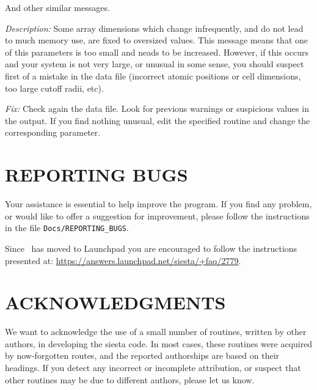 \begin{description}
\itemsep 10pt
\parsep 0pt

\item[\texttt{chkdim: ERROR: In \textit{routine} dimension \textit{parameter} =
\textit{value}. It must be  ...}]

And other similar messages.

\textit{Description:} Some array dimensions which change infrequently,
and do not lead to much memory use, are fixed to oversized
values. This message means that one of this parameters is too small
and neads to be increased.  However, if this occurs and your system is
not very large, or unusual in some sense, you should suspect first of
a mistake in the data file (incorrect atomic positions or cell
dimensions, too large cutoff radii, etc).

\textit{Fix:} Check again the data file.  Look for previous warnings or
suspicious values in the output.  If you find nothing unusual, edit
the specified routine and change the corresponding parameter.  

\end{description}




\section{REPORTING BUGS}

Your assistance is essential to help improve the program. If you find
any problem, or would like to offer a suggestion for improvement,
please follow the instructions in the file
\texttt{Docs/REPORTING\_BUGS}. 

Since \siesta\ has moved to Launchpad you are encouraged to follow the
instructions presented at:
\url{https://answers.launchpad.net/siesta/+faq/2779}.



\section{ACKNOWLEDGMENTS}

We want to acknowledge the use of a small number of routines,
written by other authors, in developing the siesta code.
In most cases, these routines were acquired by now-forgotten
routes, and the reported authorships are based on their headings.
If you detect any incorrect or incomplete attribution, or suspect
that other routines may be due to different authors, please
let us know.

